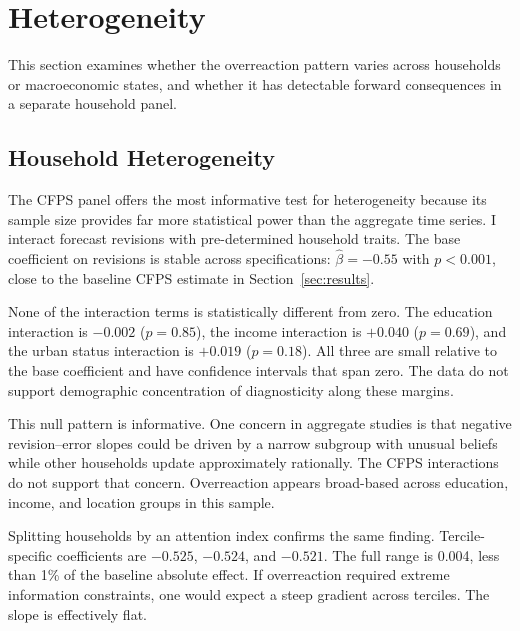 \section{Heterogeneity}\label{sec:heterogeneity}

This section examines whether the overreaction pattern varies across
households or macroeconomic states, and whether it has detectable
forward consequences in a separate household panel.

\subsection{Household Heterogeneity}

The CFPS panel offers the most informative test for heterogeneity
because its sample size provides far more statistical power than the
aggregate time series. I interact forecast revisions with
pre-determined household traits. The base coefficient on revisions is
stable across specifications: $\hat{\beta} = -0.55$ with $p < 0.001$,
close to the baseline CFPS estimate in Section~\ref{sec:results}.

None of the interaction terms is statistically different from zero. The
education interaction is $-0.002$ ($p = 0.85$), the income interaction
is $+0.040$ ($p = 0.69$), and the urban status interaction is $+0.019$
($p = 0.18$). All three are small relative to the base coefficient and
have confidence intervals that span zero. The data do not support
demographic concentration of diagnosticity along these margins.

This null pattern is informative. One concern in aggregate studies is
that negative revision--error slopes could be driven by a narrow
subgroup with unusual beliefs while other households update
approximately rationally. The CFPS interactions do not support that
concern. Overreaction appears broad-based across education, income, and
location groups in this sample.

Splitting households by an attention index confirms the same finding.
Tercile-specific coefficients are $-0.525$, $-0.524$, and $-0.521$.
The full range is 0.004, less than 1\% of the baseline absolute
effect. If overreaction required extreme information constraints, one
would expect a steep gradient across terciles. The slope is effectively
flat.




